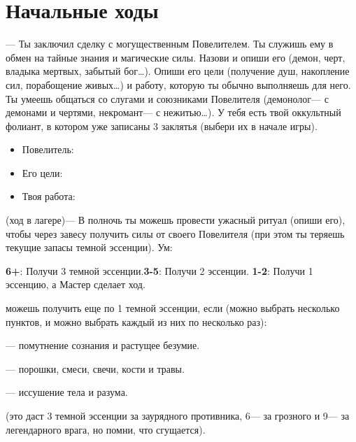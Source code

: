 \documentclass[10pt,twoside]{report}
\begin{document}






\section*{Начальные ходы}
\begin{description}[noitemsep]
\item[Сделка с Тьмой]--- Ты заключил сделку с могущественным Повелителем. Ты
служишь ему в обмен на тайные знания и магические силы. Назови и опиши
его (демон, черт, владыка мертвых, забытый бог\ldots). Опиши его цели
(получение душ, накопление сил, порабощение живых\ldots) и работу,
которую ты обычно выполняешь для него. Ты умеешь общаться со слугами и
союзниками Повелителя (демонолог--- с демонами и чертями, некромант--- с
нежитью\ldots). У тебя есть твой оккультный фолиант, в котором уже
записаны 3 заклятья (выбери их в начале игры).
\begin{itemize}[noitemsep]
\item Повелитель:
\item Его цели:
\item Твоя работа:
\end{itemize}
\vfill
\pagebreak

\item[Жуткий Ритуал] (ход в лагере)--- В полночь ты можешь провести
  ужасный ритуал (опиши его), чтобы через завесу получить силы от своего
Повелителя (при этом ты теряешь текущие запасы темной эссенции). { Ум:}

 \textbf{6+}: Получи 3 темной эссенции.\textbf{3-5}: Получи 2 эссенции.  \textbf{1-2}: Получи 1 эссенцию, а Мастер сделает ход.

{ можешь получить еще по 1 темной эссенции, если} (можно выбрать
несколько пунктов, и можно выбрать каждый из них по несколько раз):

\begin{description}[noitemsep]
\item[Потратить 1 Волю]--- помутнение сознания и растущее безумие.
\item[Потратить 1 Запас]--- порошки, смеси, свечи, кости и травы.
\item[Получить травму]--- иссушение тела и разума.

\item[Принести жертву] (это даст 3 темной эссенции за заурядного
  противника, 6--- за грозного и 9--- за легендарного врага, но помни,
  что { сгущается}).


\end{description}
\end{description}
\end{document}
